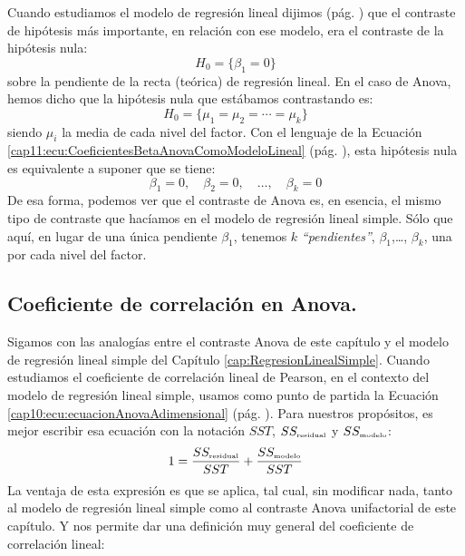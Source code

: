 Cuando estudiamos el modelo de regresión lineal dijimos (pág. \pageref{cap10:subsubsec:ContrasteHipotesisPendienteVariablesIncorreladas}) que el contraste de hipótesis más importante, en relación con ese modelo, era el contraste de la hipótesis nula:
\[
H_0=\{\beta_1=0\}
\]
sobre la pendiente de la recta (teórica) de regresión lineal. En el caso de Anova, hemos dicho que la hipótesis nula que estábamos contrastando es:
\[
H_0=\{\mu_1=\mu_2=\cdots=\mu_k\}
\]
siendo $\mu_i$ la media de cada nivel del factor. Con el lenguaje de la Ecuación \ref{cap11:ecu:CoeficientesBetaAnovaComoModeloLineal} (pág. \pageref{cap11:ecu:CoeficientesBetaAnovaComoModeloLineal}), esta hipótesis nula es equivalente a suponer que se tiene:
\[
\beta_1=0,\quad\beta_2=0,\quad \ldots,\quad \beta_k=0
\]
De esa forma, podemos ver que el contraste de Anova es, en esencia, el mismo tipo de contraste que hacíamos en el modelo de regresión lineal simple. Sólo que aquí, en lugar de una única pendiente $\beta_1$, tenemos $k$ {\em ``pendientes''}, $\beta_1$,\ldots, $\beta_k$, una por cada nivel del factor.


\subsection{Coeficiente de correlación en Anova.}
\label{cap11:subsec:CoeficienteCorrelacionAnova}

Sigamos con las analogías entre el contraste Anova de este capítulo y el modelo de regresión lineal simple del Capítulo \ref{cap:RegresionLinealSimple}. Cuando estudiamos el coeficiente de correlación lineal de Pearson, en el contexto del modelo de regresión lineal simple, usamos como punto de partida la Ecuación \ref{cap10:ecu:ecuacionAnovaAdimensional} (pág. \pageref{cap10:ecu:ecuacionAnovaAdimensional}). Para nuestros propósitos, es mejor escribir esa ecuación con la notación $SST$, $SS_{\mbox{\tiny residual}}$ y $SS_{\mbox{\tiny modelo}}$:
\begin{equation}
\label{cap11:ecu:DefinicionGenericaCoeficienteCorrelacion}
1=\dfrac{SS_{\mbox{\tiny residual}}}{SST}+\dfrac{SS_{\mbox{\tiny modelo}}}{SST}
\end{equation}
La ventaja de esta expresión es que se aplica, tal cual, sin modificar nada, tanto al modelo de regresión lineal simple como al contraste Anova unifactorial de este capítulo. Y nos permite dar una definición muy general del coeficiente de correlación lineal:\\

